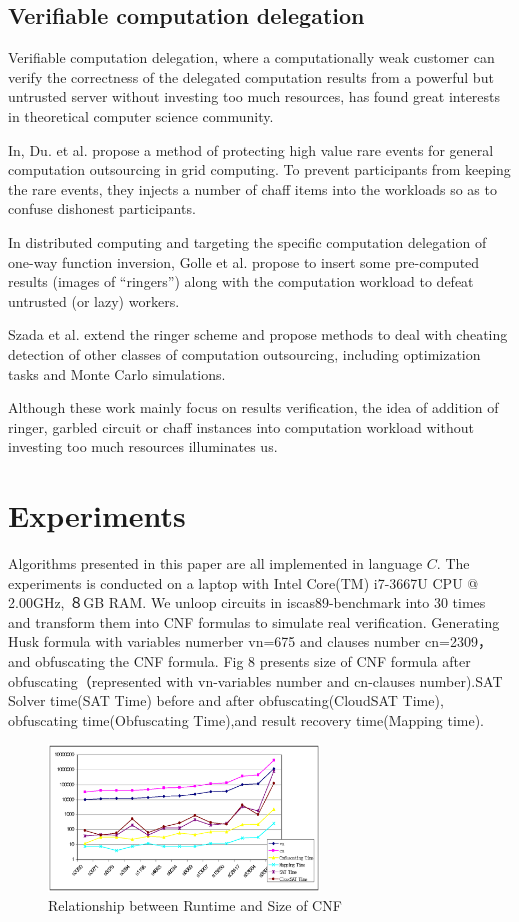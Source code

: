 \documentclass[runningheads,a4paper]{llncs}
\begin{document}
\subsection{Verifiable computation delegation}

Verifiable computation delegation, where a computationally weak customer can verify the correctness of the delegated computation results from a powerful but untrusted server without investing too much resources, has found great interests in theoretical computer science community.

In\cite{t17}, Du. et al. propose a method of protecting high value rare events for general computation outsourcing in grid computing. To prevent participants from keeping the rare events, they injects a number of chaff items into the workloads so as to confuse dishonest participants.

In distributed computing and targeting the specific computation delegation of one-way function inversion, Golle et al. \cite{t31} propose to insert some pre-computed results (images of “ringers”) along with the computation workload to defeat untrusted (or lazy) workers. 

Szada et al. \cite{t33} extend the ringer scheme and propose methods to deal with cheating detection of other classes of computation outsourcing, including optimization tasks and Monte Carlo simulations.

Although these work mainly focus on results verification, the idea of addition of ringer, garbled circuit or chaff instances into computation workload without investing too much resources illuminates us.
\section{Experiments} 

Algorithms presented in this paper are all implemented in language $C$.
The experiments is conducted on a laptop with Intel Core(TM) i7-3667U CPU @ 2.00GHz, ８GB RAM. 
We unloop circuits in iscas89-benchmark into 30 times and transform them into CNF formulas to simulate real verification.
Generating Husk formula with variables numerber vn=675 and clauses number cn=2309，and obfuscating the CNF formula. 
Fig 8 presents size of CNF formula after obfuscating（represented with vn-variables number and cn-clauses number).SAT Solver time(SAT Time) before and after obfuscating(CloudSAT Time),
obfuscating time(Obfuscating Time),and result recovery time(Mapping time).


\begin{figure}
\centering
\includegraphics[width=7.2cm]{p1}
\caption{Relationship between Runtime and Size of CNF }
\end{figure}
\end{document}
